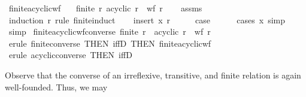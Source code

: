 \begin{isabellebody}
{}
\isamarkuptrue%
%
\endisatagdocument
{\isafolddocument}%
%
\isadelimdocument
%
\endisadelimdocument
{}\isamarkupfalse%
\ finite{\isacharunderscore}{\kern0pt}acyclic{\isacharunderscore}{\kern0pt}wf{\isacharcolon}{\kern0pt}\isanewline
\ \ \ {\isachardoublequoteopen}finite\ r{\isachardoublequoteclose}\ {\isachardoublequoteopen}acyclic\ r{\isachardoublequoteclose}\ \ {\isachardoublequoteopen}wf\ r{\isachardoublequoteclose}\isanewline
%
\isadelimproof
\ \ %
\endisadelimproof
%
\isatagproof
{}\isamarkupfalse%
\ assms\isanewline
{}\isamarkupfalse%
\ {\isacharparenleft}{\kern0pt}induction\ r\ rule{\isacharcolon}{\kern0pt}\ finite{\isacharunderscore}{\kern0pt}induct{\isacharparenright}{\kern0pt}\isanewline
\ \ \isamarkupfalse%
\ {\isacharparenleft}{\kern0pt}insert\ x\ r{\isacharparenright}{\kern0pt}\isanewline
\ \ \isamarkupfalse%
\ \isamarkupfalse%
\ {\isacharquery}{\kern0pt}case\isanewline
\ \ \ \ \isamarkupfalse%
\ {\isacharparenleft}{\kern0pt}cases\ x{\isacharparenright}{\kern0pt}\ simp\isanewline
{}\isamarkupfalse%
\ simp%
\endisatagproof
{\isafoldproof}%
%
\isadelimproof
\isanewline
%
\endisadelimproof
\isanewline
{}\isamarkupfalse%
\ finite{\isacharunderscore}{\kern0pt}acyclic{\isacharunderscore}{\kern0pt}wf{\isacharunderscore}{\kern0pt}converse{\isacharcolon}{\kern0pt}\ {\isachardoublequoteopen}finite\ r\ {\isasymLongrightarrow}\ acyclic\ r\ {\isasymLongrightarrow}\ wf\ {\isacharparenleft}{\kern0pt}r{\isasyminverse}{\isacharparenright}{\kern0pt}{\isachardoublequoteclose}\isanewline
%
\isadelimproof
\ \ %
\endisadelimproof
%
\isatagproof
{}\isamarkupfalse%
\ {\isacharparenleft}{\kern0pt}erule\ finite{\isacharunderscore}{\kern0pt}converse\ {\isacharbrackleft}{\kern0pt}THEN\ iffD{}{\isacharcomma}{\kern0pt}\ THEN\ finite{\isacharunderscore}{\kern0pt}acyclic{\isacharunderscore}{\kern0pt}wf{\isacharbrackright}{\kern0pt}{\isacharparenright}{\kern0pt}\isanewline
\ \ \isamarkupfalse%
\ {\isacharparenleft}{\kern0pt}erule\ acyclic{\isacharunderscore}{\kern0pt}converse\ {\isacharbrackleft}{\kern0pt}THEN\ iffD{}{\isacharbrackright}{\kern0pt}{\isacharparenright}{\kern0pt}\isanewline
\ \ \isamarkupfalse%
%
\endisatagproof
{\isafoldproof}%
%
\isadelimproof
%
\endisadelimproof
%
\begin{isamarkuptext}%
Observe that the converse of an irreflexive, transitive,
  and finite relation is again well-founded. Thus, we may

\end{isamarkuptext}
\end{isabellebody}
